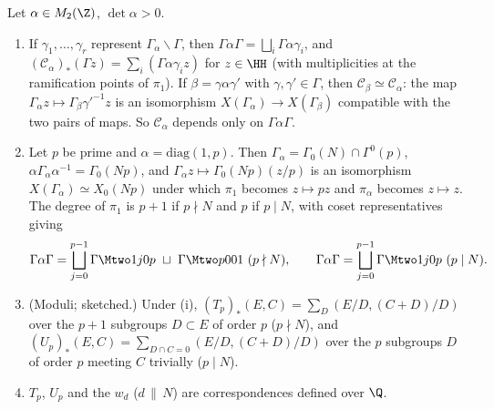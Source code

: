 \begin{proposition}\label{prop:moddeg:hecke-correspondence}
Let $\alpha\in M_2(\Z)$, $\det\alpha>0$.
\begin{enumerate}[label=(\roman*)]
\item If $\gamma_1,\dots,\gamma_r$ represent $\Gamma_\alpha\backslash\Gamma$, then $\Gamma\alpha\Gamma=\bigsqcup_i\Gamma\alpha\gamma_i$, and $(\mathcal C_\alpha)_*(\Gamma z)=\sum_i(\Gamma\alpha\gamma_iz)$ for
$z\in\HH$ (with multiplicities at the ramification points of $\pi_1$). If $\beta=\gamma\alpha\gamma'$ with $\gamma,\gamma'\in\Gamma$, then $\mathcal C_\beta\simeq\mathcal C_\alpha$: the map
$\Gamma_\alpha z\mapsto\Gamma_\beta\gamma'^{-1}z$ is an isomorphism $X(\Gamma_\alpha)\to X(\Gamma_\beta)$ compatible with the two pairs of maps. So $\mathcal C_\alpha$ depends only on
$\Gamma\alpha\Gamma$.
\item Let $p$ be prime and $\alpha=\mathrm{diag}(1,p)$. Then $\Gamma_\alpha=\Gamma_0(N)\cap\Gamma^0(p)$, $\alpha\Gamma_\alpha\alpha^{-1}=\Gamma_0(Np)$, and $\Gamma_\alpha z\mapsto\Gamma_0(Np)(z/p)$
is an isomorphism $X(\Gamma_\alpha)\simeq X_0(Np)$ under which $\pi_1$ becomes $z\mapsto pz$ and $\pi_\alpha$ becomes $z\mapsto z$. The degree of $\pi_1$ is $p+1$ if $p\nmid N$ and
$p$ if $p\mid N$, with coset representatives giving
\[
\Gamma\alpha\Gamma=\bigsqcup_{j=0}^{p-1}\Gamma\Mtwo1j0p\ \sqcup\ \Gamma\Mtwo p001\ (p\nmid N),\qquad\Gamma\alpha\Gamma=\bigsqcup_{j=0}^{p-1}\Gamma\Mtwo1j0p\ (p\mid N).
\]
\item (Moduli; sketched.) Under (i), $(T_p)_*(E,C)=\sum_D(E/D,(C+D)/D)$ over the $p+1$ subgroups $D\subset E$ of order $p$ ($p\nmid N$), and
$(U_p)_*(E,C)=\sum_{D\cap C=0}(E/D,(C+D)/D)$ over the $p$ subgroups $D$ of order $p$ meeting $C$ trivially ($p\mid N$).
\item $T_p$, $U_p$ and the $w_d$ ($d\,\|\,N$) are correspondences defined over $\Q$.
\end{enumerate}
\end{proposition}

